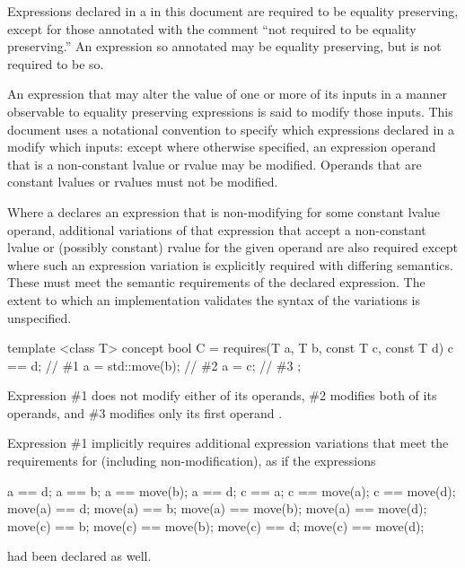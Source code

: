 \pnum
Expressions declared in a  in this document are
required to be equality preserving, except for those annotated with the comment
``not required to be equality preserving.'' An expression so annotated
may be equality preserving, but is not required to be so.

\pnum
An expression that may alter the value of one or more of its inputs in a manner
observable to equality preserving expressions is said to modify those inputs.
This document uses a notational convention to specify which expressions declared
in a  modify which inputs: except where otherwise
specified, an expression operand that is a non-constant lvalue or rvalue may be
modified. Operands that are constant lvalues or rvalues must not be modified.

\pnum
Where a  declares an expression that is non-modifying
for some constant lvalue operand, additional variations of that expression that accept
a non-constant lvalue or (possibly constant) rvalue for the given operand are also
required except where such an expression variation is explicitly required with
differing semantics. These  must meet the semantic
requirements of the declared expression. The extent to which an implementation
validates the syntax of the variations is unspecified.

\enterexample
\begin{codeblock}
template <class T>
concept bool C =
  requires(T a, T b, const T c, const T d) {
    c == d;           // \#1
    a = std::move(b); // \#2
    a = c;            // \#3
  };
\end{codeblock}

Expression \#1 does not modify either of its operands, \#2 modifies both of its
operands, and \#3 modifies only its first operand .

Expression \#1 implicitly requires additional expression variations that meet the
requirements for  (including non-modification), as if the expressions
\begin{codeblock}
a == d;       a == b;             a == move(b);       a == d;
c == a;       c == move(a);       c == move(d);
move(a) == d; move(a) == b;       move(a) == move(b); move(a) == move(d);
move(c) == b; move(c) == move(b); move(c) == d;       move(c) == move(d);
\end{codeblock}
had been declared as well.

